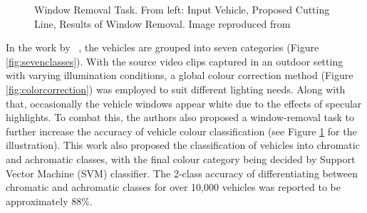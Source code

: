 \begin{figure}[!htb]
 \centering {}
 \caption[Window Removal Task. From left: Input
Vehicle, Proposed Cutting Line, Results of Window Removal]{Window Removal Task.
From left: Input Vehicle, Proposed Cutting Line, Results of Window Removal.
Image reproduced from~
 \label{fig:windowremoval}}
\end{figure}

In the work by
~, the vehicles are grouped into seven categories (Figure \ref{fig:sevenclasses}). With the source video clips captured in an outdoor setting with varying illumination conditions, a global colour correction method (Figure \ref{fig:colorcorrection}) was employed to suit different lighting needs. Along with that, occasionally the vehicle windows appear white due to the effects of specular highlights. To combat this, the authors also proposed a window-removal task to further increase the accuracy of vehicle colour classification (see Figure \ref{fig:windowremoval} for the illustration). This work also proposed the classification of vehicles into chromatic and achromatic classes, with the final colour category being decided by Support Vector Machine (SVM) classifier. The 2-class accuracy of differentiating between chromatic and achromatic classes for over 10,000 vehicles was reported to be approximately 88\%.

